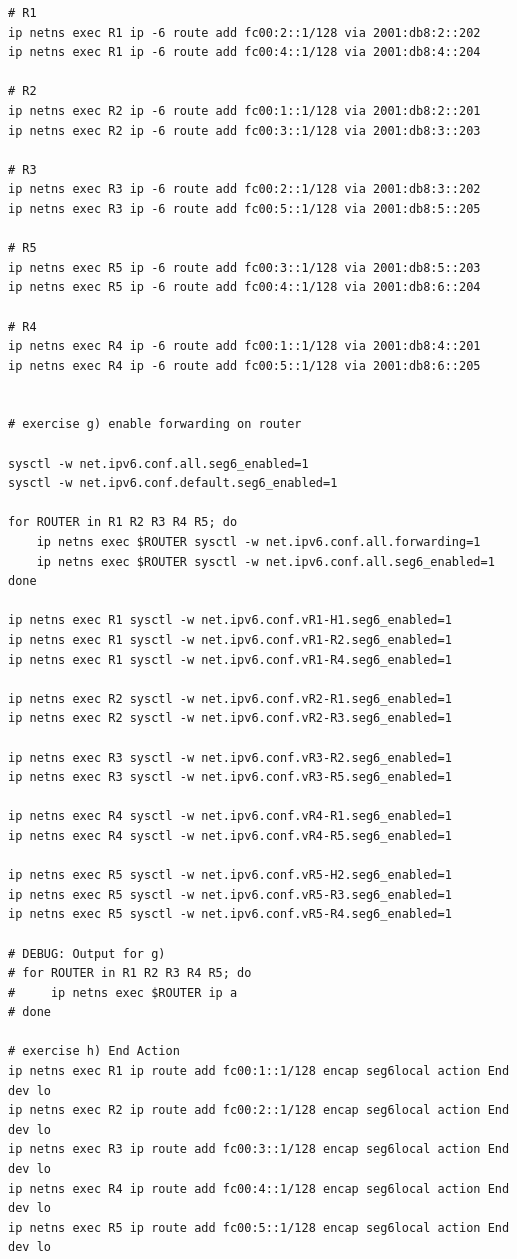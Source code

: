 \documentclass{article}
\begin{document}
\begin{verbatim}
# R1
ip netns exec R1 ip -6 route add fc00:2::1/128 via 2001:db8:2::202
ip netns exec R1 ip -6 route add fc00:4::1/128 via 2001:db8:4::204

# R2
ip netns exec R2 ip -6 route add fc00:1::1/128 via 2001:db8:2::201
ip netns exec R2 ip -6 route add fc00:3::1/128 via 2001:db8:3::203

# R3
ip netns exec R3 ip -6 route add fc00:2::1/128 via 2001:db8:3::202
ip netns exec R3 ip -6 route add fc00:5::1/128 via 2001:db8:5::205

# R5
ip netns exec R5 ip -6 route add fc00:3::1/128 via 2001:db8:5::203
ip netns exec R5 ip -6 route add fc00:4::1/128 via 2001:db8:6::204

# R4
ip netns exec R4 ip -6 route add fc00:1::1/128 via 2001:db8:4::201
ip netns exec R4 ip -6 route add fc00:5::1/128 via 2001:db8:6::205


# exercise g) enable forwarding on router

sysctl -w net.ipv6.conf.all.seg6_enabled=1
sysctl -w net.ipv6.conf.default.seg6_enabled=1

for ROUTER in R1 R2 R3 R4 R5; do
    ip netns exec $ROUTER sysctl -w net.ipv6.conf.all.forwarding=1
    ip netns exec $ROUTER sysctl -w net.ipv6.conf.all.seg6_enabled=1
done

ip netns exec R1 sysctl -w net.ipv6.conf.vR1-H1.seg6_enabled=1
ip netns exec R1 sysctl -w net.ipv6.conf.vR1-R2.seg6_enabled=1
ip netns exec R1 sysctl -w net.ipv6.conf.vR1-R4.seg6_enabled=1

ip netns exec R2 sysctl -w net.ipv6.conf.vR2-R1.seg6_enabled=1
ip netns exec R2 sysctl -w net.ipv6.conf.vR2-R3.seg6_enabled=1

ip netns exec R3 sysctl -w net.ipv6.conf.vR3-R2.seg6_enabled=1
ip netns exec R3 sysctl -w net.ipv6.conf.vR3-R5.seg6_enabled=1

ip netns exec R4 sysctl -w net.ipv6.conf.vR4-R1.seg6_enabled=1
ip netns exec R4 sysctl -w net.ipv6.conf.vR4-R5.seg6_enabled=1

ip netns exec R5 sysctl -w net.ipv6.conf.vR5-H2.seg6_enabled=1
ip netns exec R5 sysctl -w net.ipv6.conf.vR5-R3.seg6_enabled=1
ip netns exec R5 sysctl -w net.ipv6.conf.vR5-R4.seg6_enabled=1

# DEBUG: Output for g)
# for ROUTER in R1 R2 R3 R4 R5; do
#     ip netns exec $ROUTER ip a
# done

# exercise h) End Action
ip netns exec R1 ip route add fc00:1::1/128 encap seg6local action End dev lo
ip netns exec R2 ip route add fc00:2::1/128 encap seg6local action End dev lo
ip netns exec R3 ip route add fc00:3::1/128 encap seg6local action End dev lo
ip netns exec R4 ip route add fc00:4::1/128 encap seg6local action End dev lo
ip netns exec R5 ip route add fc00:5::1/128 encap seg6local action End dev lo



\end{verbatim}
\end{document}
